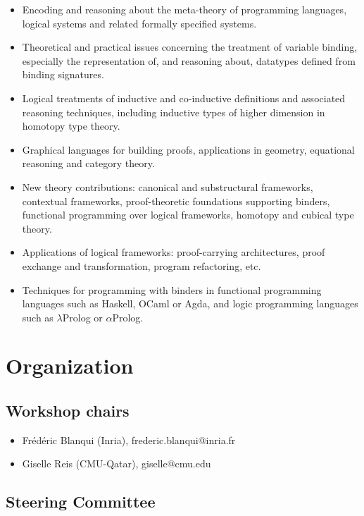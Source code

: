 \documentclass{article}
\begin{document}
\begin{itemize}
\item Encoding and reasoning about the meta-theory of programming languages, logical systems and related formally specified systems.
\item Theoretical and practical issues concerning the treatment of variable binding, especially the representation of, and reasoning about, datatypes defined from binding signatures.
\item Logical treatments of inductive and co-inductive definitions and associated reasoning techniques, including inductive types of higher dimension in homotopy type theory.
\item Graphical languages for building proofs, applications in geometry, equational reasoning and category theory.
\item New theory contributions: canonical and substructural frameworks, contextual frameworks, proof-theoretic foundations supporting binders, functional programming over logical frameworks, homotopy and cubical type theory.
\item Applications of logical frameworks: proof-carrying architectures, proof exchange and transformation, program refactoring, etc.
\item Techniques for programming with binders in functional programming languages such as Haskell, OCaml or Agda, and logic programming languages such as $\lambda$Prolog or $\alpha$Prolog.
\end{itemize}

\section{Organization}

\subsection{Workshop chairs}

\begin{itemize}
\item Fr\'ed\'eric Blanqui (Inria), frederic.blanqui@inria.fr
\item Giselle Reis (CMU-Qatar), giselle@cmu.edu
\end{itemize}

\subsection{Steering Committee}
\end{document}
